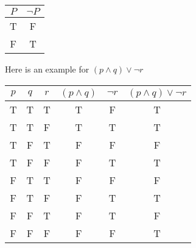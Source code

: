 \documentclass{report}
\begin{document}
    \begin{center}
        \begin{tabular}{|c|c|}
            \hline
            $P$ & $\lnot P$ \\
            \hline
            T & F \\
            F & T \\
            \hline
        \end{tabular}
    \end{center}
    \bigbreak \noindent 
    Here is an example for $(p \land q) \lor \neg r$
    \bigbreak \noindent 
      \begin{center}
          \begin{tabular}{|c|c|c|c|c|c|}
            \hline
            \(p\) & \(q\) & \(r\) & \((p \land q)\) & \(\neg r\) & \((p \land q) \lor \neg r\) \\
            \hline
            T & T & T & T & F & T \\
            \hline 
            T & T & F & T & T & T \\
            \hline
            T & F &T & F &F&F \\
            \hline
            T&F&F&F&T&T \\
            \hline
            F&T&T&F&F&F \\
            \hline 
            F&T&F&F&T&T \\
            \hline
            F&F&T&F&T&F \\
            \hline
            F&F&F&F&F&T \\
            \hline
        \end{tabular}
      \end{center}
\end{document}
